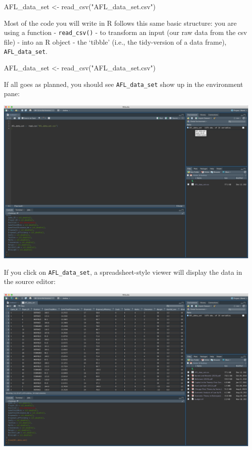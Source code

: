 \documentclass[
]{article}
\newenvironment{Shaded}{\begin{snugshade}}{\end{snugshade}}
\newcommand{\FunctionTok}[1]{\textcolor[rgb]{0.00,0.00,0.00}{#1}}
\newcommand{\NormalTok}[1]{#1}
\newcommand{\OtherTok}[1]{\textcolor[rgb]{0.56,0.35,0.01}{#1}}
\newcommand{\StringTok}[1]{\textcolor[rgb]{0.31,0.60,0.02}{#1}}
\begin{document}
\begin{Shaded}
\begin{Highlighting}[]
\NormalTok{AFL\_data\_set }\OtherTok{\textless{}{-}} \FunctionTok{read\_csv}\NormalTok{(}\StringTok{"AFL\_data\_set.csv"}\NormalTok{)}
\end{Highlighting}
\end{Shaded}

Most of the code you will write in R follows this same basic structure:
you are using a function - \texttt{read\_csv()} - to transform an input
(our raw data from the csv file) - into an R object - the `tibble'
(i.e., the tidy-version of a data frame), \texttt{AFL\_data\_set}.

\begin{Shaded}
\begin{Highlighting}[]
\NormalTok{AFL\_data\_set }\OtherTok{\textless{}{-}} \FunctionTok{read\_csv}\NormalTok{(}\StringTok{"AFL\_data\_set.csv"}\NormalTok{)}
\end{Highlighting}
\end{Shaded}

If all goes as planned, you should see \texttt{AFL\_data\_set} show up
in the environment pane:

\includegraphics{Images/enviro_pane.png}

If you click on \texttt{AFL\_data\_set}, a spreadsheet-style viewer will
display the data in the source editor:

\includegraphics{Images/viewer.png}
\end{document}
